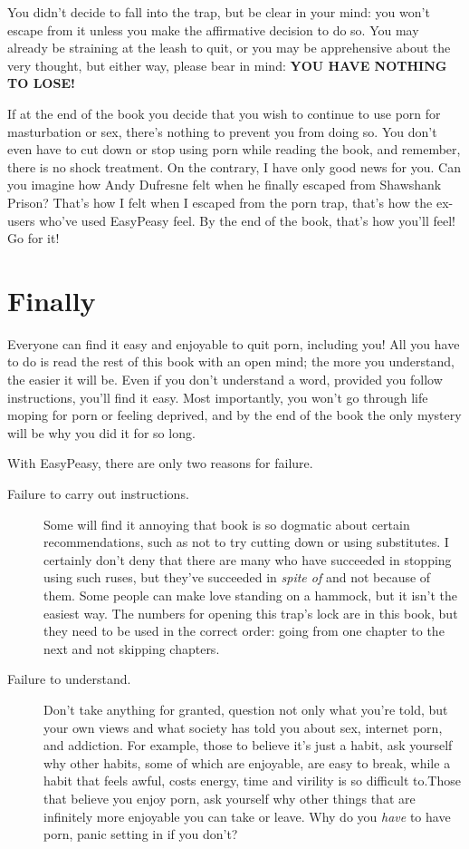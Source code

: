 \documentclass[easypeasy.tex]{subfiles}
\begin{document}
You didn't decide to fall into the trap, but be clear in your mind: you won't escape from it unless you make the affirmative decision to do so. You may already be straining at the leash to quit, or you may be apprehensive about the very thought, but either way, please bear in mind: \textbf{YOU HAVE NOTHING TO LOSE!}

If at the end of the book you decide that you wish to continue to use porn for masturbation or sex, there's nothing to prevent you from doing so. You don't even have to cut down or stop using porn while reading the book, and remember, there is no shock treatment. On the contrary, I have only good news for you. Can you imagine how Andy Dufresne felt when he finally escaped from Shawshank Prison? That's how I felt when I escaped from the porn trap, that's how the ex-users who've used EasyPeasy feel. By the end of the book, that's how you'll feel! Go for it!

\section{Finally}

Everyone can find it easy and enjoyable to quit porn, including you! All you have to do is read the rest of this book with an open mind; the more you understand, the easier it will be. Even if you don't understand a word, provided you follow instructions, you'll find it easy. Most importantly, you won't go through life moping for porn or feeling deprived, and by the end of the book the only mystery will be why you did it for so long.

With EasyPeasy, there are only two reasons for failure.

\begin{description}
  \item [Failure to carry out instructions.] Some will find it annoying that book is so dogmatic about certain recommendations, such as not to try cutting down or using substitutes. I certainly don't deny that there are many who have succeeded in stopping using such ruses, but they've succeeded in \textit{spite of} and not because of them. Some people can make love standing on a hammock, but it isn't the easiest way. The numbers for opening this trap's lock are in this book, but they need to be used in the correct order: going from one chapter to the next and not skipping chapters.

  \item [Failure to understand.] Don't take anything for granted, question not only what you're told, but your own views and what society has told you about sex, internet porn, and addiction. For example, those to believe it's just a habit, ask yourself why other habits, some of which are enjoyable, are easy to break, while a habit that feels awful, costs energy, time and virility is so difficult to.Those that believe you enjoy porn, ask yourself why other things that are infinitely more enjoyable you can take or leave. Why do you \textit{have} to have porn, panic setting in if you don't?

\end{description}
\end{document}
